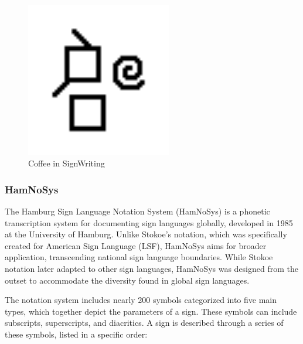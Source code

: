 \documentclass[../../main.tex]{subfiles}
\begin{document}
\begin{figure}
  \centering \includegraphics[width = 2.5in]{chapters/background_work/images/signwriting_coffee.png}
  \caption{Coffee in SignWriting}
  \label{fig:signwriting_coffee}
\end{figure}

\subsubsection{HamNoSys}

The Hamburg Sign Language Notation System (HamNoSys) is a phonetic transcription system for documenting sign languages globally, developed in 1985 at the University of Hamburg. Unlike Stokoe's notation, which was specifically created for American Sign Language (LSF), HamNoSys aims for broader application, transcending national sign language boundaries. While Stokoe notation later adapted to other sign languages, HamNoSys was designed from the outset to accommodate the diversity found in global sign languages.

The notation system includes nearly 200 symbols categorized into five main types, which together depict the parameters of a sign. These symbols can include subscripts, superscripts, and diacritics. A sign is described through a series of these symbols, listed in a specific order:
\end{document}
